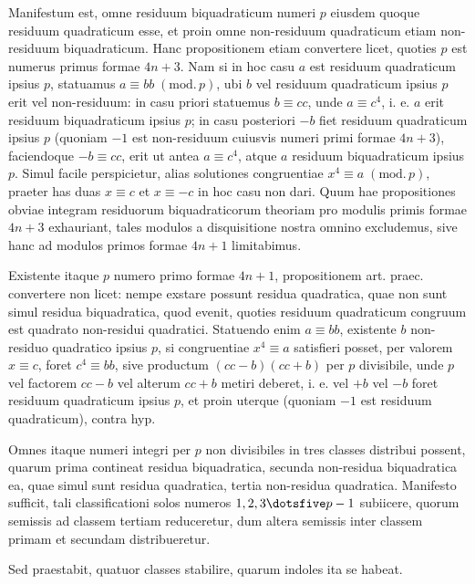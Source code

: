 Manifestum est, omne residuum biquadraticum numeri $p$ eiusdem quoque residuum quadraticum esse, et proin omne non-residuum quadraticum etiam non-residuum biquadraticum. Hanc propositionem etiam convertere licet, quoties $p$ est numerus primus formae $4n+3$. Nam si in hoc casu $a$ est residuum quadraticum ipsius $p$, statuamus $a\equiv bb\; (\mathrm{mod.}\,p)$, ubi $b$ vel residuum quadraticum ipsius $p$ erit vel non-residuum: in casu priori statuemus $b\equiv cc$, unde $a\equiv c^4$, i. e. $a$ erit residuum biquadraticum ipsius $p$; in casu posteriori $-b$ fiet residuum quadraticum ipsius $p$ (quoniam $-1$ est non-residuum cuiusvis numeri primi formae $4n+3$), faciendoque $-b\equiv cc$, erit ut antea $a\equiv c^4$, atque $a$ residuum biquadraticum ipsius $p$. Simul facile perspicietur, alias solutiones congruentiae $x^4\equiv a\; (\mathrm{mod.}\,p)$, praeter has duas $x\equiv c$ et $x\equiv-c$ in hoc casu non dari. Quum hae propositiones obviae integram residuorum biquadraticorum theoriam pro modulis primis formae $4n+3$ exhauriant, tales modulos a disquisitione nostra omnino excludemus, sive hanc ad modulos primos formae $4n+1$ limitabimus.

Existente itaque $p$ numero primo formae $4n+1$, propositionem art. praec. convertere non licet: nempe exstare possunt residua quadratica, quae non sunt simul residua biquadratica, quod evenit, quoties residuum quadraticum congruum est quadrato non-residui quadratici. Statuendo enim $a\equiv bb$, existente $b$ non-%
%
residuo quadratico ipsius $p$, si congruentiae $x^4\equiv a$ satisfieri posset, per valorem $x\equiv c$, foret $c^4\equiv bb$, sive productum $(cc-b)(cc+b)$ per $p$ divisibile, unde $p$ vel factorem $cc-b$ vel alterum $cc+b$ metiri deberet, i. e. vel $+b$ vel $-b$ foret residuum quadraticum ipsius $p$, et proin uterque (quoniam $-1$ est residuum quadraticum), contra hyp.

Omnes itaque numeri integri per $p$ non divisibiles in tres classes distribui possent, quarum prima contineat residua biquadratica, secunda non-residua biquadratica ea, quae simul sunt residua quadratica, tertia non-residua quadratica. Manifesto sufficit, tali classificationi solos numeros $1,2,3\dotsfive p-1$ subiicere, quorum semissis ad classem tertiam reduceretur, dum altera semissis inter classem primam et secundam distribueretur.

Sed praestabit, quatuor classes stabilire, quarum indoles ita se habeat.

